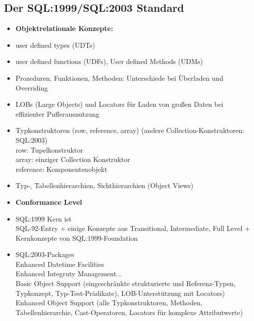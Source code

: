 \subsection{Der SQL:1999/SQL:2003 Standard}
\begin{itemize}
	\item \textbf{Objektrelationale Konzepte:}
	\item user defined types (UDTs)
	\item user defined functions (UDFs), User defined Methods (UDMs)
	\item Prozeduren, Funktionen, Methoden: Unterschiede bei Überladen und Overriding
	\item LOBs (Large Objects) und Locators für Laden von großen Daten bei effizienter Pufferausnutzung
	\item Typkonstruktoren (row, reference, array) (andere Collection-Konstruktoren: SQL:2003)\\
	row: Tupelkonstruktor\\
	array: einziger Collection Konstruktor\\
	reference: Komponentenobjekt
	\item Typ-, Tabellenhierarchien, Sichthierarchien (Object Views)
	
	\item \textbf{Conformance Level}
	\item SQL:1999 Kern ist\\
	SQL-92-Entry + einige Konzepte aus Transitional, Intermediate, Full Level + Kernkonzepte von SQL:1999-Foundation
	\item SQL:2003-Packages\\
	Enhanced Datetime Facilities\\
	Enhanced Integruty Management...\\
	Basic Object Support (eingeschränkte strukturierte und Referenz-Typen, Typkonzept, Typ-Test-Prädikate), LOB-Unterstützung mit Locators)\\
	Enhanced Object Support (alle Typkonstruktoren, Methoden, Tabellenhierarchie, Cast-Operatoren, Locators für komplexe Attributwerte)
\end{itemize}

